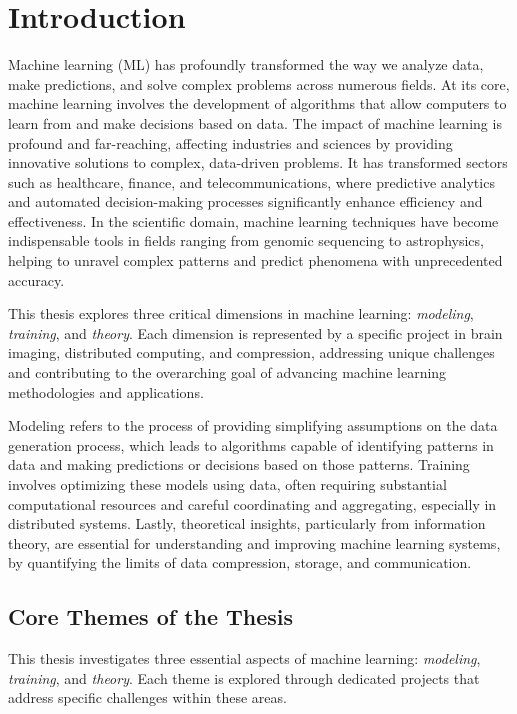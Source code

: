 \chapter{Introduction} \label{ch:intro}

Machine learning (ML) has profoundly transformed the way we analyze data, make predictions, and solve complex problems across numerous fields. At its core, machine learning involves the development of algorithms that allow computers to learn from and make decisions based on data.
The impact of machine learning is profound and far-reaching, affecting industries and sciences by providing innovative solutions to complex, data-driven problems. It has transformed sectors such as healthcare, finance, and telecommunications, where predictive analytics and automated decision-making processes significantly enhance efficiency and effectiveness. In the scientific domain, machine learning techniques have become indispensable tools in fields ranging from genomic sequencing to astrophysics, helping to unravel complex patterns and predict phenomena with unprecedented accuracy.

This thesis explores three critical dimensions in machine learning: \textit{modeling}, \textit{training}, and \textit{theory}. Each dimension is represented by a specific project in brain imaging, distributed computing, and compression, addressing unique challenges and contributing to the overarching goal of advancing machine learning methodologies and applications.

Modeling refers to the process of providing simplifying assumptions on the data generation process, which leads to algorithms capable of identifying patterns in data and making predictions or decisions based on those patterns. Training involves optimizing these models using data, often requiring substantial computational resources and careful coordinating and aggregating, especially in distributed systems. Lastly, theoretical insights, particularly from information theory, are essential for understanding and improving machine learning systems, by quantifying the limits of data compression, storage, and communication.

\section{Core Themes of the Thesis}
This thesis investigates three essential aspects of machine learning: \textit{modeling}, \textit{training}, and \textit{theory}. Each theme is explored through dedicated projects that address specific challenges within these areas. 

